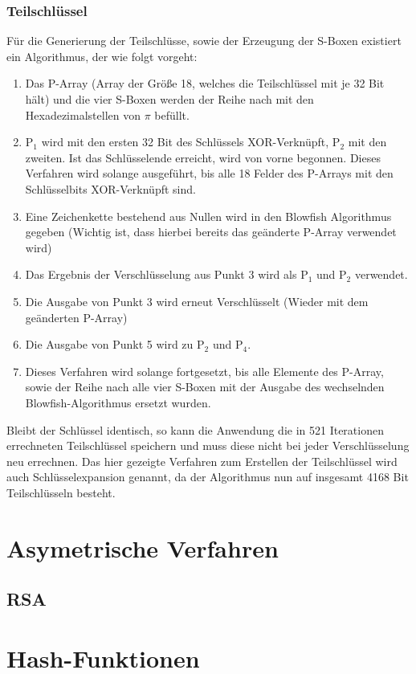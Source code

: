 \documentclass[10pt, a4paper]{scrreprt}
\begin{document}
\subsubsection{Teilschlüssel}
Für die Generierung der Teilschlüsse, sowie der Erzeugung der S-Boxen existiert ein Algorithmus, der wie folgt vorgeht:
\begin{enumerate}
\item Das P-Array (Array der Größe 18, welches die Teilschlüssel mit je 32 Bit hält) und die vier S-Boxen werden der Reihe nach mit den Hexadezimalstellen von $\pi$ befüllt.
\item P$_{1}$ wird mit den ersten 32 Bit des Schlüssels XOR-Verknüpft, P$_{2}$ mit den zweiten. Ist das Schlüsselende erreicht, wird von vorne begonnen. Dieses Verfahren wird solange ausgeführt, bis alle 18 Felder des P-Arrays mit den Schlüsselbits XOR-Verknüpft sind.
\item Eine Zeichenkette bestehend aus Nullen wird in den Blowfish Algorithmus gegeben (Wichtig ist, dass hierbei bereits das geänderte P-Array verwendet wird)
\item Das Ergebnis der Verschlüsselung aus Punkt 3 wird als P$_{1}$ und P$_{2}$ verwendet.
\item Die Ausgabe von Punkt 3 wird erneut Verschlüsselt (Wieder mit dem geänderten P-Array)
\item Die Ausgabe von Punkt 5 wird zu P$_{2}$ und P$_{4}$.
\item Dieses Verfahren wird solange fortgesetzt, bis alle Elemente des P-Array, sowie der Reihe nach alle vier S-Boxen mit der Ausgabe des wechselnden Blowfish-Algorithmus ersetzt wurden.
\end{enumerate}
Bleibt der Schlüssel identisch, so kann die Anwendung die in 521 Iterationen errechneten Teilschlüssel speichern und muss diese nicht bei jeder Verschlüsselung neu errechnen.
Das hier gezeigte Verfahren zum Erstellen der Teilschlüssel wird auch Schlüsselexpansion genannt, da der Algorithmus nun auf insgesamt 4168 Bit Teilschlüsseln besteht. 

\section{Asymetrische Verfahren}
\subsection{RSA}

\section{Hash-Funktionen}
\end{document}

